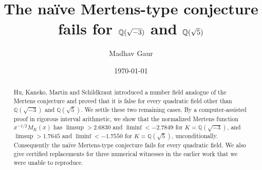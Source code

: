 \documentclass[11pt]{amsart}
\title{The na\"ive Mertens-type conjecture fails for $\Q(\sqrt{-3})$ and $\Q(\sqrt5)$}
\author{Madhav Gaur}
\date{\today}
\newcommand{\Q}{\mathbb{Q}}
\begin{document}
\begin{abstract}
Hu, Kaneko, Martin and Schildkraut introduced a number field analogue of the Mertens conjecture and proved that it is
false for every quadratic field other than $\Q(\sqrt{-3})$ and $\Q(\sqrt5)$. We settle these two remaining cases. By
a computer-assisted proof in rigorous interval arithmetic, we show that the normalized Mertens function
$x^{-1/2}M_K(x)$ has $\limsup>2.6830$ and $\liminf<-2.7849$ for $K=\Q(\sqrt{-3})$, and $\limsup>1.7645$ and
$\liminf<-1.7550$ for $K=\Q(\sqrt5)$, unconditionally. Consequently the na\"ive Mertens-type conjecture fails for every
quadratic field. We also give certified replacements for three numerical witnesses in the earlier work that we were
unable to reproduce.
\end{abstract}

\maketitle
\end{document}
